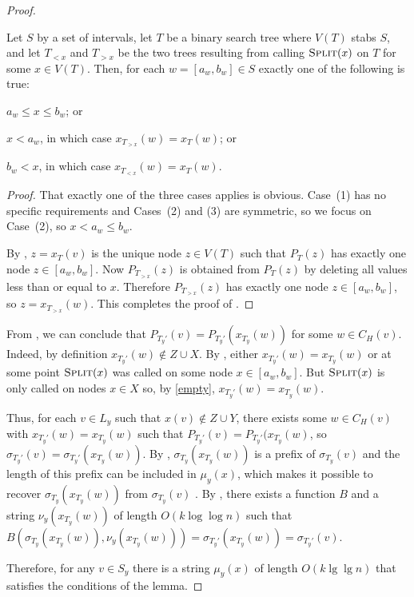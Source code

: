 \documentclass[kpfonts]{patmorin}
\let\le\leqslant
\begin{document}
\begin{proof}
  \begin{clm}
    Let $S$ by a set of intervals, let $T$ be a binary search tree where $V(T)$ stabs $S$, and let $T_{<x}$ and $T_{>x}$ be the two trees resulting from calling $\textsc{Split}(x)$ on $T$ for some $x\in V(T)$.  Then, for each $w=[a_w,b_w]\in S$ exactly one of the following is true:
    \begin{compactenum}
      \item $a_w\le x\le b_w$; or
      \item $x< a_w$, in which case $x_{T_{>x}}(w)=x_T(w)$; or
      \item $b_w < x$, in which case $x_{T_{<x}}(w)=x_T(w)$.
    \end{compactenum}
  \end{clm}

  \begin{proof}
    That exactly one of the three cases applies is obvious.  Case~(1) has no specific requirements and Cases~(2) and (3) are symmetric, so we focus on Case~(2), so $x < a_w\le b_w$.
    
    By , $z=x_T(v)$ is the unique node $z\in V(T)$ such that $P_T(z)$ has exactly one node $z\in [a_w,b_w]$.  Now $P_{T_{>x}}(z)$ is obtained from $P_T(z)$ by deleting all values less than or equal to $x$. Therefore $P_{T_{>x}}(z)$ has exactly one node $z\in[a_w,b_w]$, so $z=x_{T_{>x}}(w)$.  This completes the proof of .
  \end{proof}
  
  From , we can conclude that $P_{T_y'}(v)=P_{T_y'}(x_{T_y}(w))$ for some $w\in C_H(v)$.  Indeed, by definition $x_{T_y'}(w)\not\in Z\cup X$. By , either $x_{T_y'}(w)=x_{T_y}(w)$ or at some point $\textsc{Split}(x)$ was called on some node $x\in[a_w,b_w]$.  But $\textsc{Split}(x)$ is only called on nodes $x\in X$ so, by \eqref{empty}, $x_{T_y'}(w)=x_{T_y}(w)$.
  
  Thus, for each $v\in L_y$ such that $x(v)\not\in Z\cup Y$, there exists some $w\in C_H(v)$ with $x_{T_y'}(w)=x_{T_y}(w)$ such that $P_{T_y'}(v)=P_{T_y'}(x_{T_y}(w)$, so $\sigma_{T_y'}(v)=\sigma_{T_y'}(x_{T_y}(w))$.  By , $\sigma_{T_y}(x_{T_y}(w))$ is a prefix of $\sigma_{T_y}(v)$ and the length of this prefix can be included in $\mu_y(x)$, which makes it possible to recover $\sigma_{T_y}(x_{T_y}(w))$ from $\sigma_{T_y}(v)$ .  By , there exists a function $B$ and a string $\nu_y(x_{T_y}(w))$ of length $O(k\log\log n)$ such that $B(\sigma_{T_y}(x_{T_y}(w)), \nu_y(x_{T_y}(w))) = \sigma_{T_y'}(x_{T_y}(w)) = \sigma_{T_y'}(v)$.
  
  Therefore, for any $v\in S_y$ there is a string $\mu_y(x)$ of length $O(k\lg\lg n)$ that satisfies the conditions of the lemma.
\end{proof}
  
\end{document}
